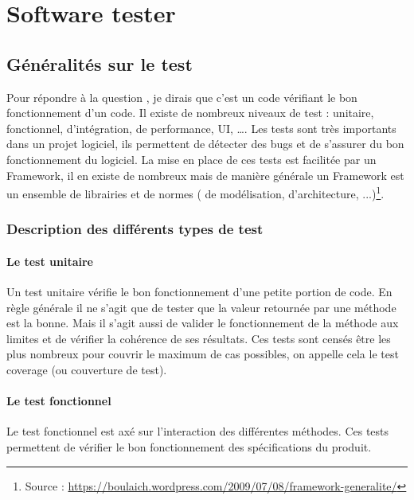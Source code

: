 \chapter{Software tester}
\section{G\'{e}n\'{e}ralit\'{e}s sur le test}

Pour répondre à la question , je dirais que c'est un code vérifiant le bon fonctionnement d'un code. Il existe de nombreux niveaux de test : unitaire, fonctionnel, d'intégration, de performance, UI, \ldots. Les tests sont très importants dans un projet logiciel, ils permettent de détecter des bugs et de s'assurer du bon fonctionnement du logiciel. La mise en place de ces tests est facilitée par un Framework, il en existe de nombreux mais de manière générale un Framework est un ensemble de librairies et de normes ( de modélisation, d'architecture, ...)\footnote{Source : \url{https://boulaich.wordpress.com/2009/07/08/framework-generalite/}}. \\
\subsection{Description des différents types de test}



\subsubsection{Le test unitaire}
Un test unitaire vérifie le bon fonctionnement d'une petite portion de code. En règle générale il ne s'agit que de tester que la valeur retournée par une méthode est la bonne. Mais il s'agit aussi de valider le fonctionnement de la méthode aux limites et de vérifier la cohérence de ses résultats. Ces tests sont censés être les plus nombreux pour couvrir le maximum de cas possibles, on appelle cela le test coverage (ou couverture de test).

\subsubsection{Le test fonctionnel}
Le test fonctionnel est axé sur l'interaction des différentes méthodes. Ces tests permettent de vérifier le bon fonctionnement des spécifications du produit.

